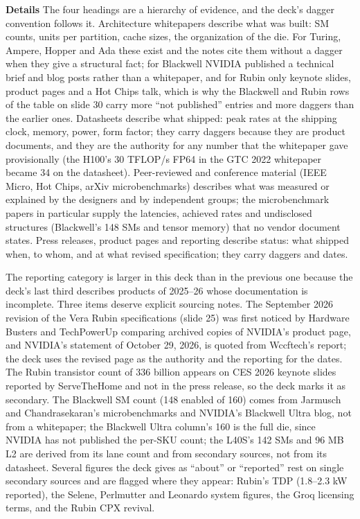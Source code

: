\documentclass[11pt,letterpaper]{article}
\newcommand{\para}[1]{\medskip\noindent\textbf{#1}\quad}
\begin{document}
\para{Details} The four headings are a hierarchy of evidence, and the deck's dagger convention follows it. Architecture whitepapers describe what was built: SM counts, units per partition, cache sizes, the organization of the die. For Turing, Ampere, Hopper and Ada these exist and the notes cite them without a dagger when they give a structural fact; for Blackwell NVIDIA published a technical brief and blog posts rather than a whitepaper, and for Rubin only keynote slides, product pages and a Hot Chips talk, which is why the Blackwell and Rubin rows of the table on slide 30 carry more ``not published'' entries and more daggers than the earlier ones. Datasheets describe what shipped: peak rates at the shipping clock, memory, power, form factor; they carry daggers because they are product documents, and they are the authority for any number that the whitepaper gave provisionally (the H100's 30 TFLOP/s FP64 in the GTC 2022 whitepaper became 34 on the datasheet). Peer-reviewed and conference material (IEEE Micro, Hot Chips, arXiv microbenchmarks) describes what was measured or explained by the designers and by independent groups; the microbenchmark papers in particular supply the latencies, achieved rates and undisclosed structures (Blackwell's 148 SMs and tensor memory) that no vendor document states. Press releases, product pages and reporting describe status: what shipped when, to whom, and at what revised specification; they carry daggers and dates.

The reporting category is larger in this deck than in the previous one because the deck's last third describes products of 2025--26 whose documentation is incomplete. Three items deserve explicit sourcing notes. The September 2026 revision of the Vera Rubin specifications (slide 25) was first noticed by Hardware Busters and TechPowerUp comparing archived copies of NVIDIA's product page, and NVIDIA's statement of October 29, 2026, is quoted from Wccftech's report; the deck uses the revised page as the authority and the reporting for the dates. The Rubin transistor count of 336 billion appears on CES 2026 keynote slides reported by ServeTheHome and not in the press release, so the deck marks it as secondary. The Blackwell SM count (148 enabled of 160) comes from Jarmusch and Chandrasekaran's microbenchmarks and NVIDIA's Blackwell Ultra blog, not from a whitepaper; the Blackwell Ultra column's 160 is the full die, since NVIDIA has not published the per-SKU count; the L40S's 142 SMs and 96 MB L2 are derived from its lane count and from secondary sources, not from its datasheet. Several figures the deck gives as ``about'' or ``reported'' rest on single secondary sources and are flagged where they appear: Rubin's TDP (1.8--2.3 kW reported), the Selene, Perlmutter and Leonardo system figures, the Groq licensing terms, and the Rubin CPX revival.
\end{document}
